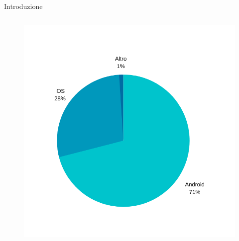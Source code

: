 \begin{frame}{Introduzione}
\begin{columns}[onlytextwidth]
\begin{column}{0.5\textwidth}
            \begin{figure}[H]
                \includegraphics[width=1\textwidth]{img/Untitled design.png}
            \end{figure}
            
        \end{column}
    \end{columns}
\end{frame}

